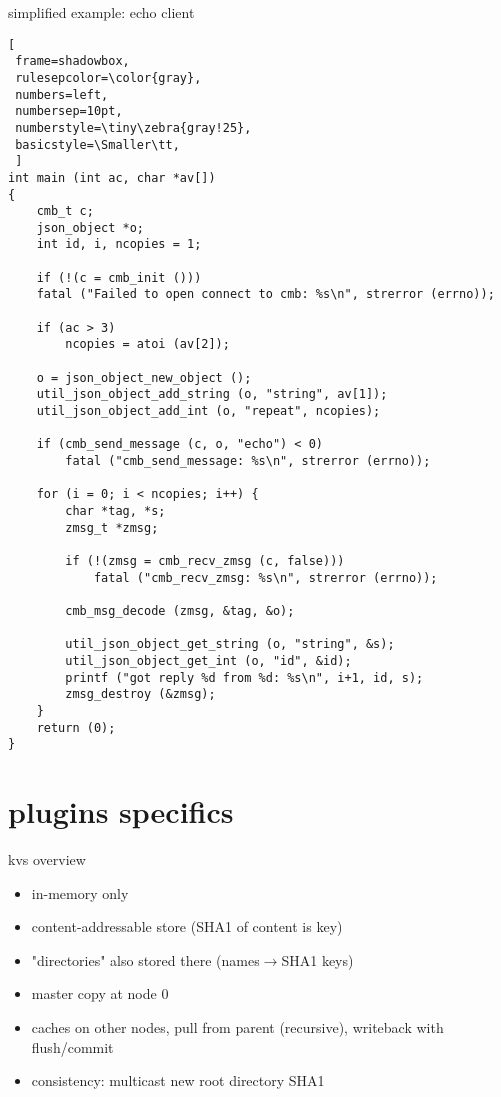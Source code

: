 \documentclass[default,pdf,colorBG,slideColor]{prosper}
\makeatletter
\newcommand\Smaller{\fontsize{5.5}{5.5}\selectfont}
\newcommand\realnumberstyle[1]{}
\newcommand{\zebra}[2]{%
    {\realnumberstyle{#2}}%
    \begingroup
    \lst@basicstyle
    \ifodd\value{lstnumber}%
        \color{#1}%
        \rlap{\hspace*{\lst@numbersep}%
        \color@block{\linewidth}{\ht\strutbox}{\dp\strutbox}%
        }%
    \fi
    \endgroup
}
\makeatother
\begin{document}
\begin{slide}{simplified example: echo client}
\vspace{-0.3in}
{\tiny\bf
\begin{lstlisting}[
 frame=shadowbox,
 rulesepcolor=\color{gray},
 numbers=left,
 numbersep=10pt,
 numberstyle=\tiny\zebra{gray!25},
 basicstyle=\Smaller\tt,
 ]
int main (int ac, char *av[])
{
    cmb_t c;
    json_object *o;
    int id, i, ncopies = 1;

    if (!(c = cmb_init ()))
	fatal ("Failed to open connect to cmb: %s\n", strerror (errno));

    if (ac > 3)
        ncopies = atoi (av[2]);

    o = json_object_new_object ();
    util_json_object_add_string (o, "string", av[1]);
    util_json_object_add_int (o, "repeat", ncopies);
    
    if (cmb_send_message (c, o, "echo") < 0)
        fatal ("cmb_send_message: %s\n", strerror (errno));

    for (i = 0; i < ncopies; i++) {
        char *tag, *s;
        zmsg_t *zmsg;

        if (!(zmsg = cmb_recv_zmsg (c, false)))
            fatal ("cmb_recv_zmsg: %s\n", strerror (errno));

        cmb_msg_decode (zmsg, &tag, &o);

        util_json_object_get_string (o, "string", &s);
        util_json_object_get_int (o, "id", &id);
        printf ("got reply %d from %d: %s\n", i+1, id, s);
        zmsg_destroy (&zmsg);
    }
    return (0);
}
\end{lstlisting}
} \end{slide}


\part{plugins specifics}

\begin{slide}{kvs overview}{\small
\begin{itemize}
  \item{in-memory only}
  \item{content-addressable store (SHA1 of content is key)}
  \item{"directories" also stored there (names$\rightarrow$SHA1 keys)}
  \item{master copy at node 0}
  \item{caches on other nodes, pull from parent (recursive),
        writeback with flush/commit}
  \item{consistency: multicast new root directory SHA1}
\end{itemize}
}\end{slide}
\end{document}
